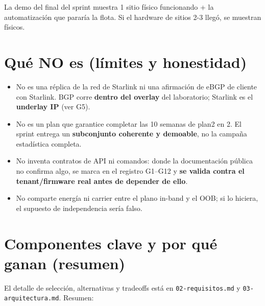 \documentclass[11pt,a4paper]{article}
\begin{document}
\begin{nota}
\small La demo del final del sprint muestra 1 sitio físico funcionando + la automatización que pararía la flota. Si el hardware de sitios 2-3 llegó, se muestran físicos.
\end{nota}

\section{Qué NO es (límites y honestidad)}
\begin{itemize}
  \item No es una réplica de la red de Starlink ni una afirmación de eBGP de cliente con Starlink. BGP corre \textbf{dentro del overlay} del laboratorio; Starlink es el \textbf{underlay IP} (ver G5).
  \item No es un plan que garantice completar las 10 semanas de plan2 en 2. El sprint entrega un \textbf{subconjunto coherente y demoable}, no la campaña estadística completa.
  \item No inventa contratos de API ni comandos: donde la documentación pública no confirma algo, se marca en el registro G1–G12 y \textbf{se valida contra el tenant/firmware real antes de depender de ello}.
  \item No comparte energía ni carrier entre el plano in-band y el OOB; si lo hiciera, el supuesto de independencia sería falso.
\end{itemize}

\section{Componentes clave y por qué ganan (resumen)}

\begin{sloppypar}
El detalle de selección, alternativas y tradeoffs está en \texttt{02-requisitos.md} y \texttt{03-arquitectura.md}. Resumen:
\end{sloppypar}
\end{document}
